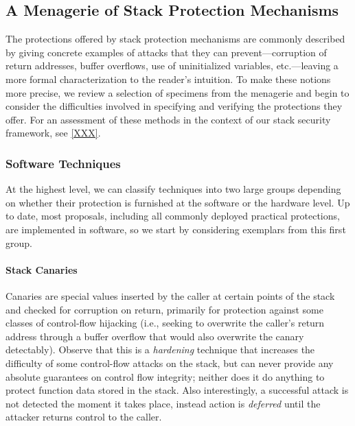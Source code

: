 \subsection{A Menagerie of Stack Protection Mechanisms}


The protections offered by stack protection mechanisms are commonly described by giving
concrete examples of attacks that they can prevent---corruption of return
addresses, buffer overflows, use of uninitialized variables, etc.---leaving
a more formal characterization to the reader's intuition.
%
To make these notions more precise, we review a selection of specimens from the
menagerie and begin to consider the difficulties involved in specifying and
verifying the protections they offer.
%
For an assessment of these methods in the context of our stack security
framework, see \cref{XXX}.

\subsubsection{Software Techniques}

At the highest level, we can classify techniques into two large groups depending
on whether their protection is furnished at the software or the hardware level.
Up to date, most proposals, including all commonly deployed practical
protections, are implemented in software, so we start by considering exemplars
from this first group.

\paragraph{Stack Canaries}
%
Canaries are special values inserted by the caller at certain points of the
stack and checked for corruption on return, primarily for protection against
some classes of control-flow hijacking (i.e., seeking to overwrite the caller's
return address through a buffer overflow that would also overwrite the canary
detectably).
%
Observe that this is a \emph{hardening} technique that increases the difficulty
of some control-flow attacks on the stack, but can never provide any absolute
guarantees on control flow integrity; neither does it do anything to protect
function data stored in the stack.
%
Also interestingly, a successful attack is not detected the moment it takes
place, instead action is \emph{deferred} until the attacker returns control to
the caller.

